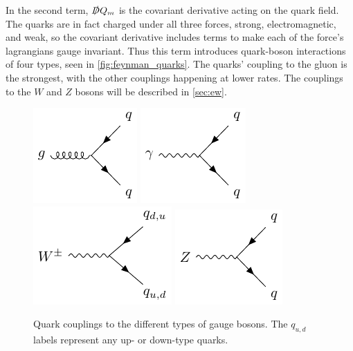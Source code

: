 In the second term, $\slashed{D} Q_m$ is the covariant derivative acting on the quark field. The quarks are in fact charged under all three forces, strong, electromagnetic, and weak, so the covariant derivative includes terms to make each of the force's lagrangians gauge invariant. Thus this term introduces quark-boson interactions of four types, seen in \autoref{fig:feynman_quarks}. The quarks' coupling to the gluon is the strongest, with the other couplings happening at lower rates. The couplings to the $W$ and $Z$ bosons will be described in \autoref{sec:ew}.

\begin{centering}
\begin{figure}[!hbt]
\myfloatalign
\includegraphics[width=.45\linewidth]{feynman/quark_strong.pdf}
\includegraphics[width=.45\linewidth]{feynman/quark_em.pdf}
\includegraphics[width=.45\linewidth]{feynman/quark_w.pdf}
\includegraphics[width=.45\linewidth]{feynman/quark_z.pdf}
\caption{Quark couplings to the different types of gauge bosons. The $q_{u,d}$ labels represent any up- or down-type quarks.}
\label{fig:feynman_quarks}
\end{figure}
\end{centering}

